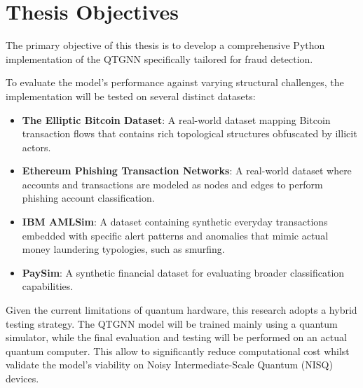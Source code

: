 \section{Thesis Objectives}\label{sc:objectives}
The primary objective of this thesis is to develop a comprehensive Python implementation of the QTGNN specifically tailored for fraud detection. 

To evaluate the model's performance against varying structural challenges, the implementation will be tested on several distinct datasets:
\begin{itemize}
    \item \textbf{The Elliptic Bitcoin Dataset}: A real-world dataset mapping Bitcoin transaction flows that contains rich topological structures obfuscated by illicit actors.
    \item \textbf{Ethereum Phishing Transaction Networks}: A real-world dataset where accounts and transactions are modeled as nodes and edges to perform phishing account classification.
    \item \textbf{IBM AMLSim}: A dataset containing synthetic everyday transactions embedded with specific alert patterns and anomalies that mimic actual money laundering typologies, such as smurfing.
    \item \textbf{PaySim}: A synthetic financial dataset for evaluating broader classification capabilities.
\end{itemize}

Given the current limitations of quantum hardware, this research adopts a hybrid testing strategy. The QTGNN model will be trained mainly using a quantum simulator, while the final evaluation and testing will be performed on an actual quantum computer.
This allow to significantly reduce computational cost whilst validate the model's viability on Noisy Intermediate-Scale Quantum (NISQ) devices.